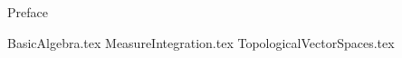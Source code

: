 \documentclass[
    oneside
]{styles/mori-book}%
\begin{document}
    \makecoverpage
    \maketitlepage

    \frontmatter
    \pagestyle{front}
    {Preface}

    \maketocpage

    \mainmatter
    \pagestyle{main}

    {BasicAlgebra.tex}
    {MeasureIntegration.tex}
    {TopologicalVectorSpaces.tex}
    
    \printindex
    \printnomenclature
    
\end{document}
